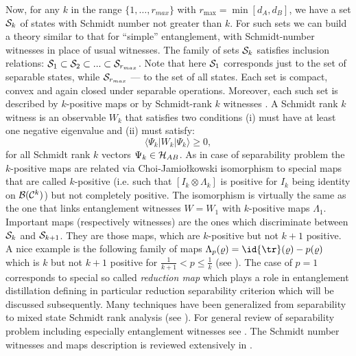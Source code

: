 \documentclass[twocolumn,aps,rmp]{revtex4}
\begin{document}
Now, for any $k$ in the range $\{1,\ldots,r_{max}\}$ with
$r_{\max}=\min[d_{A},d_{B}]$, we have a set ${\cal S}_{k}$ of states
with Schmidt number not greater than $k$.  For such sets we can build
a theory similar to that for ``simple'' entanglement, with
Schmidt-number witnesses in place of usual witnesses. The family of
sets ${\cal S}_{k}$ satisfies inclusion relations: ${\cal S}_{1}
\subset {\cal S}_{2} \subset ... \subset {\cal S}_{r_{max}}$. Note
that here ${\cal S}_{1}$ corresponds just to the set of separable
states, while ${\cal S}_{r_{max}}$ --- to the set of all states. Each
set is compact, convex and again closed under separable operations.
Moreover, each such set is described by $k$-positive maps
\cite{Terhal-Pawel-rank} or by Schmidt-rank $k$ witnesses
\cite{SchmidtWitn}. A Schmidt rank $k$ witness is an observable
$W_{k}$ that satisfies two conditions (i) must have at least one
negative eigenvalue and (ii) must satisfy:
\begin{equation}
\langle \Psi_{k} |W_{k}|\Psi_{k}\rangle \geq 0,
\end{equation}
for all Schmidt rank $k$ vectors $\Psi_{k}\in {\cal H}_{AB}$. As in
case of separability problem the $k$-positive maps are related via
Choi-Jamio\l{}kowski isomorphism to special maps that are called
$k$-positive (i.e. such that $[I_{k} \otimes \Lambda_{k}]$ is positive
for $I_{k}$ being identity on ${\cal B}({\cal C}^{k})$) but not
completely positive. The isomorphism is virtually the same as the one
that links entanglement witnesses $W=W_{1}$ with $k$-positive maps
$\Lambda_{1}$. Important maps (respectively witnesses) are the ones
which discriminate between ${\cal S}_{k}$ and ${\cal S}_{k+1}$. They
are those maps, which are $k$-positive but not $k+1$ positive. A nice
example is the following family of maps $\Lambda_{p}(\varrho)=\id
{\tr}(\varrho) - p(\varrho)$ which is $k$ but not $k+1$ positive for
$\frac{1}{k+1}<p \leq \frac{1}{k}$ (see \cite{Terhal-Pawel-rank}). The
case of $p=1$ corresponds to special so called {\it reduction map}
which plays a role in entanglement distillation defining in particular
reduction separability criterion which will be discussed subsequently.
Many techniques have been generalized from separability to mixed state
Schmidt rank analysis (see \cite{SchmidtWitn}). For general review of
separability problem including especially entanglement witnesses see
\cite{BrussReview,TerhalReview,BrussReflections}. The Schmidt number
witnesses and maps description is reviewed extensively in
\cite{BrussReflections}.
\end{document}
